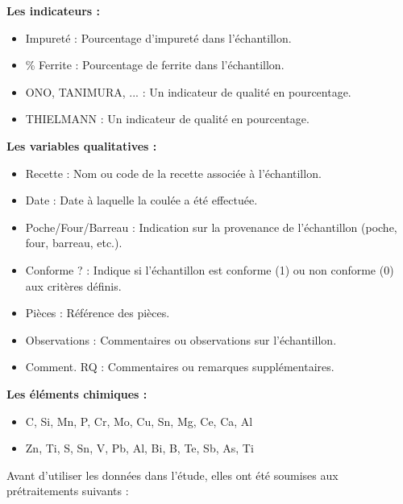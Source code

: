 \documentclass[12pt]{article}
\begin{document}
\textbf{Les indicateurs :}

\begin{itemize}
\item Impureté : Pourcentage d'impureté dans l'échantillon.
\item \% Ferrite : Pourcentage de ferrite dans l'échantillon.
\item ONO, TANIMURA, ... : Un indicateur de qualité en pourcentage.
\item THIELMANN : Un indicateur de qualité en pourcentage.
\end{itemize}
 

\textbf{Les variables qualitatives :}

\begin{itemize}
\item Recette : Nom ou code de la recette associée à l'échantillon.
\item Date : Date à laquelle la coulée a été effectuée.
\item Poche/Four/Barreau : Indication sur la provenance de l'échantillon (poche, four, barreau, etc.).
\item Conforme ? : Indique si l'échantillon est conforme (1) ou non conforme (0) aux critères définis.
\item Pièces : Référence des pièces.
\item Observations : Commentaires ou observations sur l'échantillon.
\item Comment. RQ : Commentaires ou remarques supplémentaires.
\end{itemize}

\textbf{Les éléments chimiques :}

\begin{itemize}
\item C, Si, Mn, P, Cr, Mo, Cu, Sn, Mg, Ce, Ca, Al 
\item Zn, Ti, S, Sn, V, Pb, Al, Bi, B, Te, Sb, As, Ti 
\end{itemize}





Avant d'utiliser les données dans l'étude, elles ont été soumises aux prétraitements suivants :
\end{document}
